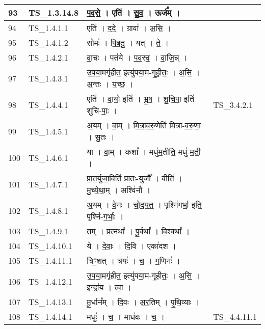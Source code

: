 \documentclass[17pt]{extarticle}
\begin{document}
\begin{longtable}{||p{0.4in}||p{0.9in}||p{4.0in}||p{0.9in}||}
        \hline
            93 & TS\_1.3.14.8 & प॒व॒से॒   ।   एति॑   ।   सु॒व॒   ।   ऊर्ज᳚म्   ।    &      \\
        \hline
            94 & TS\_1.4.1.1 & एति॑   ।   द॒दे॒   ।   ग्रावा᳚   ।   अ॒सि॒   ।    &      \\
        \hline
            95 & TS\_1.4.1.2 & सोमः॑   ।   पि॒ब॒तु॒   ।   यत्   ।   ते॒   ।    &      \\
        \hline
            96 & TS\_1.4.2.1 & वा॒चः   ।   पत॑ये   ।   प॒व॒स्व॒   ।   वा॒जि॒न्न्   ।    &      \\
        \hline
            97 & TS\_1.4.3.1 & उ॒प॒या॒मगृ॑हीत॒ इत्यु॑पया॒म{-}गृ॒ही॒तः॒   ।   अ॒सि॒   ।   अ॒न्तः   ।   य॒च्छ॒   ।    &      \\
        \hline
            98 & TS\_1.4.4.1 & एति॑   ।   वा॒यो॒ इति॑   ।   भू॒ष॒   ।   शु॒चि॒पा॒ इति॑ शुचि{-}पाः॒   ।    &  TS\_3.4.2.1       \\
        \hline
            99 & TS\_1.4.5.1 & अ॒यम्   ।   वा॒म्   ।   मि॒त्रा॒व॒रु॒णेति॑ मित्रा{-}व॒रु॒णा॒   ।   सु॒तः   ।    &      \\
        \hline
            100 & TS\_1.4.6.1 & या   ।   वा॒म्   ।   कशा᳚   ।   मधु॑म॒तीति॒ मधु॑{-}म॒ती॒   ।    &      \\
        \hline
            101 & TS\_1.4.7.1 & प्रा॒त॒र्युजा॒विति॑ प्रातः{-}युजौ᳚   ।   वीति॑   ।   मु॒च्ये॒था॒म्   ।   अश्वि॑नौ   ।    &      \\
        \hline
            102 & TS\_1.4.8.1 & अ॒यम्   ।   वे॒नः   ।   चो॒द॒य॒त्॒   ।   पृश्नि॑गर्भा॒ इति॒ पृश्नि॑{-}ग॒र्भाः॒   ।    &      \\
        \hline
            103 & TS\_1.4.9.1 & तम्   ।   प्र॒त्नथा᳚   ।   पू॒र्वथा᳚   ।   वि॒श्वथा᳚   ।    &      \\
        \hline
            104 & TS\_1.4.10.1 & ये   ।   दे॒वाः॒   ।   दि॒वि   ।   एका॑दश   ।    &      \\
        \hline
            105 & TS\_1.4.11.1 & त्रिꣳ॒॒शत्   ।   त्रयः॑   ।   च॒   ।   ग॒णिनः॑   ।    &      \\
        \hline
            106 & TS\_1.4.12.1 & उ॒प॒या॒मगृ॑हीत॒ इत्यु॑पया॒म{-}गृ॒ही॒तः॒   ।   अ॒सि॒   ।   इन्द्रा॑य   ।   त्वा॒   ।    &      \\
        \hline
            107 & TS\_1.4.13.1 & मू॒र्धान᳚म्   ।   दि॒वः   ।   अ॒र॒तिम्   ।   पृ॒थि॒व्याः   ।    &      \\
        \hline
            108 & TS\_1.4.14.1 & मधुः॑   ।   च॒   ।   माध॑वः   ।   च॒   ।    &  TS\_4.4.11.1       \\

\end{longtable}
\end{document}
